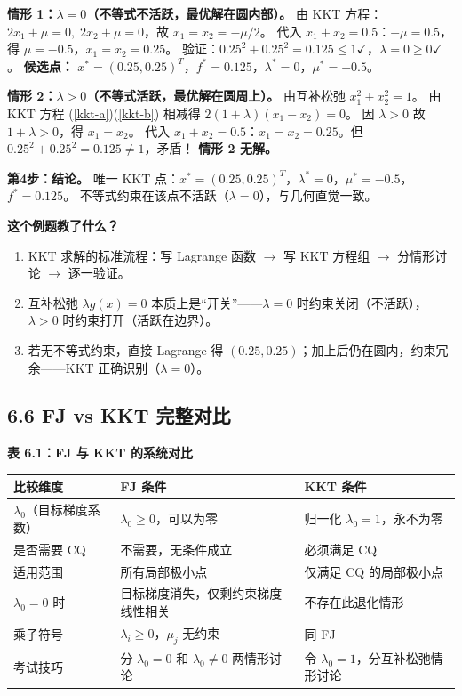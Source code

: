 \textbf{情形 1：$\lambda = 0$（不等式不活跃，最优解在圆内部）。}
由 KKT 方程：$2x_1+\mu=0,\; 2x_2+\mu=0$，故 $x_1=x_2=-\mu/2$。
代入 $x_1+x_2=0.5$：$-\mu=0.5$，得 $\mu=-0.5$，$x_1=x_2=0.25$。
验证：$0.25^2+0.25^2=0.125\le 1 \checkmark$，$\lambda=0\ge 0 \checkmark$。
\textbf{候选点：} $x^*=(0.25,0.25)^T$，$f^*=0.125$，$\lambda^*=0$，$\mu^*=-0.5$。

\textbf{情形 2：$\lambda > 0$（不等式活跃，最优解在圆周上）。}
由互补松弛 $x_1^2+x_2^2 = 1$。
由 KKT 方程 (\ref{kkt-a})(\ref{kkt-b}) 相减得 $2(1+\lambda)(x_1-x_2)=0$。
因 $\lambda>0$ 故 $1+\lambda>0$，得 $x_1=x_2$。
代入 $x_1+x_2=0.5$：$x_1=x_2=0.25$。但 $0.25^2+0.25^2=0.125 \neq 1$，矛盾！
\textbf{情形 2 无解。}

\smallskip
\textbf{第4步：结论。}
唯一 KKT 点：$x^*=(0.25,0.25)^T$，$\lambda^*=0$，$\mu^*=-0.5$，$f^*=0.125$。
不等式约束在该点不活跃（$\lambda=0$），与几何直觉一致。

\begin{notebox}
\textbf{这个例题教了什么？}
\begin{enumerate}
  \item KKT 求解的标准流程：写 Lagrange 函数 $\to$ 写 KKT 方程组 $\to$ 分情形讨论 $\to$ 逐一验证。
  \item 互补松弛 $\lambda g(x)=0$ 本质上是“开关”——$\lambda=0$ 时约束关闭（不活跃），$\lambda>0$ 时约束打开（活跃在边界）。
  \item 若无不等式约束，直接 Lagrange 得 $(0.25,0.25)$；加上后仍在圆内，约束冗余——KKT 正确识别（$\lambda=0$）。
\end{enumerate}
\end{notebox}

\subsection{6.6 FJ vs KKT 完整对比}

\begin{defbox}
\textbf{表 6.1：FJ 与 KKT 的系统对比}
\medskip
{\footnotesize
\begin{tabular}{@{}p{22mm}@{}p{36mm}@{}p{36mm}@{}}
\toprule
\textbf{比较维度} & \textbf{FJ 条件} & \textbf{KKT 条件} \\
\midrule
$\lambda_0$（目标梯度系数）
  & $\lambda_0\ge0$，可以为零
  & 归一化 $\lambda_0=1$，永不为零 \\
\addlinespace
是否需要 CQ
  & 不需要，无条件成立
  & 必须满足 CQ\\
\addlinespace
适用范围
  & 所有局部极小点
  & 仅满足 CQ 的局部极小点 \\
\addlinespace
$\lambda_0=0$ 时
  & 目标梯度消失，仅剩约束梯度线性相关
  & 不存在此退化情形 \\
\addlinespace
乘子符号
  & $\lambda_i\ge0$，$\mu_j$ 无约束
  & 同 FJ \\
\addlinespace
考试技巧
  & 分 $\lambda_0=0$ 和 $\lambda_0\neq0$ 两情形讨论
  & 令 $\lambda_0=1$，分互补松弛情形讨论 \\
\bottomrule
\end{tabular}
}
\end{defbox}

